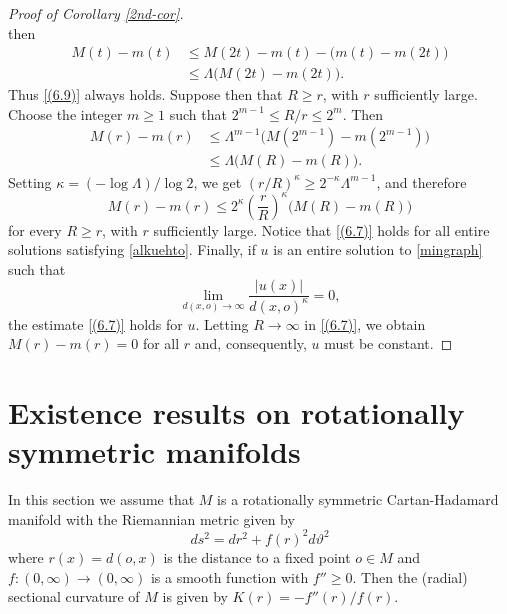 \documentclass[10pt,a4paper,reqno]{amsart}
\numberwithin{equation}{section}
\theoremstyle{plain}
\theoremstyle{definition}
\begin{document}
\begin{proof}[Proof of Corollary \ref{2nd-cor}]
\[\]
then 
\begin{align*}
M(t)-m(t)&\le M(2t)-m(t)-\bigl(m(t)-m(2t)\bigr)\\
&\le \Lambda\bigl(M(2t)-m(2t)\bigr).
\end{align*}
Thus \eqref{(6.9)} always holds. Suppose then that $R\ge r$, with $r$ sufficiently large. Choose the integer $m\ge 1$ such that
$2^{m-1}\le R/r\le 2^m$. Then
\begin{align*}
M(r)-m(r)&\le \Lambda^{m-1}\bigl(M(2^{m-1})-m(2^{m-1})\bigr)\\
&\le \Lambda\bigl(M(R)-m(R)\bigr).
\end{align*}
Setting $\kappa=(-\log\Lambda)/\log 2$, we get 
$(r/R)^\kappa\ge 2^{-\kappa}\Lambda^{m-1}$, and therefore
\begin{equation}\label{(6.7)}
M(r)-m(r)\le 2^{\kappa}\left(\frac{r}{R}\right)^{\kappa}\bigl(M(R)-m(R)\bigr)
\end{equation}
for every $R\ge r$, with $r$ sufficiently large. 
Notice that \eqref{(6.7)} holds for all entire solutions satisfying \eqref{alkuehto}. Finally, if $u$ is an entire solution to \eqref{mingraph} 
such that
\[
\lim_{d(x,o)\to\infty}\frac{|u(x)|}{d(x,o)^{\kappa}}=0,
\]
the estimate 
\eqref{(6.7)} holds for $u$. Letting $R\to\infty$ in \eqref{(6.7)}, we obtain $M(r)-m(r)=0$ for all $r$ and, consequently, $u$ must be constant.
\end{proof}
   
\section{Existence results on rotationally symmetric manifolds}\label{sec4}

In this section we assume that $M$ is a rotationally symmetric Cartan-Hadamard manifold with the 
Riemannian metric given by
    \[
     ds^2 = dr^2 + f(r)^2 d\vartheta^2
    \]
where $r(x)=d(o,x)$ is the distance to a fixed point $o\in M$ and $f\colon(0,\infty)\to(0,\infty)$
is a smooth function with $f''\ge 0$. 
Then the (radial) sectional curvature of 
$M$ is given by $K(r) = -f''(r)/f(r)$.
\end{document}
